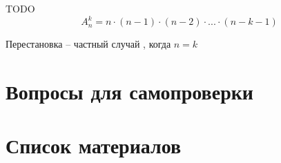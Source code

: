 \begin{frame}
TODO 
\begin{equation*}
A_n^k = n \cdot (n-1) \cdot (n-2) \cdot ... \cdot (n-k-1)
\end{equation*}  
\end{frame}

\begin{frame}{Перестановка}
 -- 
частный случай , 
когда $n=k$ 
\end{frame}


\section{Вопросы для самопроверки}


\section{Список материалов}


  
